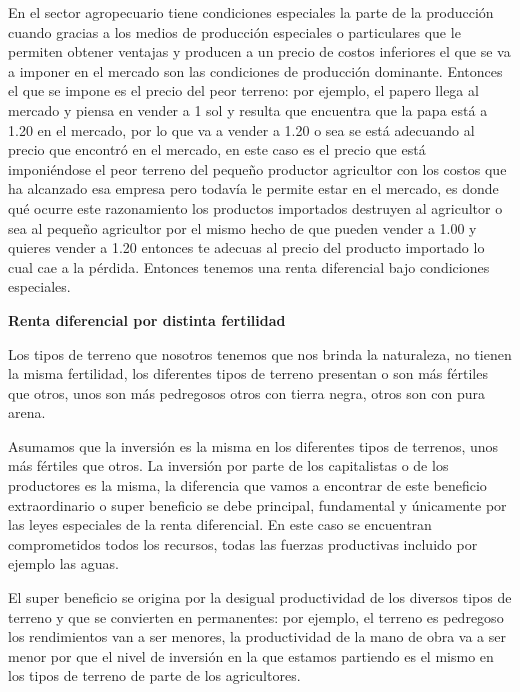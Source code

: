 \documentclass[
  letterpaper,
  DIV=11,
  numbers=noendperiod]{scrartcl}
\begin{document}
En el sector agropecuario tiene condiciones especiales la parte de la
producción cuando gracias a los medios de producción especiales o
particulares que le permiten obtener ventajas y producen a un precio de
costos inferiores el que se va a imponer en el mercado son las
condiciones de producción dominante. Entonces el que se impone es el
precio del peor terreno: por ejemplo, el papero llega al mercado y
piensa en vender a 1 sol y resulta que encuentra que la papa está a 1.20
en el mercado, por lo que va a vender a 1.20 o sea se está adecuando al
precio que encontró en el mercado, en este caso es el precio que está
imponiéndose el peor terreno del pequeño productor agricultor con los
costos que ha alcanzado esa empresa pero todavía le permite estar en el
mercado, es donde qué ocurre este razonamiento los productos importados
destruyen al agricultor o sea al pequeño agricultor por el mismo hecho
de que pueden vender a 1.00 y quieres vender a 1.20 entonces te adecuas
al precio del producto importado lo cual cae a la pérdida. Entonces
tenemos una renta diferencial bajo condiciones especiales.

\textbf{Renta diferencial por distinta fertilidad}

Los tipos de terreno que nosotros tenemos que nos brinda la naturaleza,
no tienen la misma fertilidad, los diferentes tipos de terreno presentan
o son más fértiles que otros, unos son más pedregosos otros con tierra
negra, otros son con pura arena.

Asumamos que la inversión es la misma en los diferentes tipos de
terrenos, unos más fértiles que otros. La inversión por parte de los
capitalistas o de los productores es la misma, la diferencia que vamos a
encontrar de este beneficio extraordinario o super beneficio se debe
principal, fundamental y únicamente por las leyes especiales de la renta
diferencial. En este caso se encuentran comprometidos todos los
recursos, todas las fuerzas productivas incluido por ejemplo las aguas.

El super beneficio se origina por la desigual productividad de los
diversos tipos de terreno y que se convierten en permanentes: por
ejemplo, el terreno es pedregoso los rendimientos van a ser menores, la
productividad de la mano de obra va a ser menor por que el nivel de
inversión en la que estamos partiendo es el mismo en los tipos de
terreno de parte de los agricultores.
\end{document}

